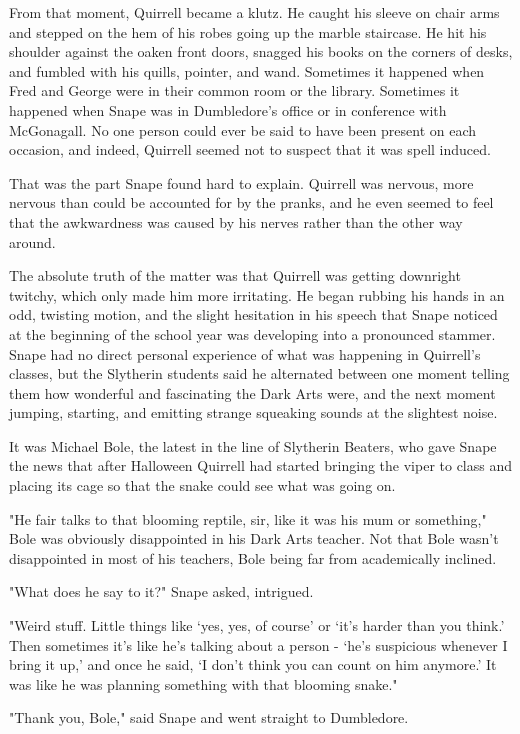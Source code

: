 From that moment, Quirrell became a klutz. He caught his sleeve on chair arms and stepped on the hem of his robes going up the marble staircase. He hit his shoulder against the oaken front doors, snagged his books on the corners of desks, and fumbled with his quills, pointer, and wand. Sometimes it happened when Fred and George were in their common room or the library. Sometimes it happened when Snape was in Dumbledore's office or in conference with McGonagall. No one person could ever be said to have been present on each occasion, and indeed, Quirrell seemed not to suspect that it was spell induced.

That was the part Snape found hard to explain. Quirrell was nervous, more nervous than could be accounted for by the pranks, and he even seemed to feel that the awkwardness was caused by his nerves rather than the other way around.

The absolute truth of the matter was that Quirrell was getting downright twitchy, which only made him more irritating. He began rubbing his hands in an odd, twisting motion, and the slight hesitation in his speech that Snape noticed at the beginning of the school year was developing into a pronounced stammer. Snape had no direct personal experience of what was happening in Quirrell's classes, but the Slytherin students said he alternated between one moment telling them how wonderful and fascinating the Dark Arts were, and the next moment jumping, starting, and emitting strange squeaking sounds at the slightest noise.

It was Michael Bole, the latest in the line of Slytherin Beaters, who gave Snape the news that after Halloween Quirrell had started bringing the viper to class and placing its cage so that the snake could see what was going on.

"He fair talks to that blooming reptile, sir, like it was his mum or something," Bole was obviously disappointed in his Dark Arts teacher. Not that Bole wasn't disappointed in most of his teachers, Bole being far from academically inclined.

"What does he say to it?" Snape asked, intrigued.

"Weird stuff. Little things like `yes, yes, of course' or `it's harder than you think.' Then sometimes it's like he's talking about a person - `he's suspicious whenever I bring it up,' and once he said, `I don't think you can count on him anymore.' It was like he was planning something with that blooming snake."

"Thank you, Bole," said Snape and went straight to Dumbledore.


